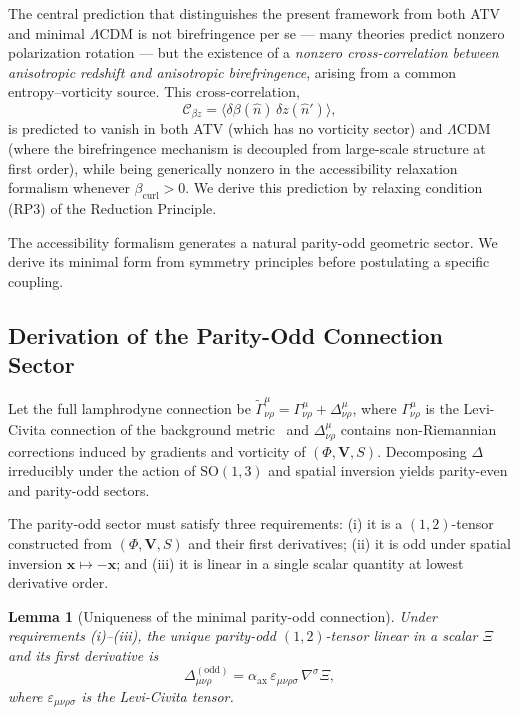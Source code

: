 \documentclass[12pt,a4paper]{article}
\theoremstyle{plain}
\newtheorem{lemma}[theorem]{Lemma}
\theoremstyle{definition}
\theoremstyle{remark}
\newcommand{\Cbz}{\mathcal{C}_{\beta z}}
\newcommand{\bcurl}{\beta_{\mathrm{curl}}}
\begin{document}
The central prediction that distinguishes the present framework from both ATV
and minimal $\Lambda$CDM is not birefringence per se --- many theories predict
nonzero polarization rotation --- but the existence of a \emph{nonzero
cross-correlation between anisotropic redshift and anisotropic birefringence},
arising from a common entropy--vorticity source. This cross-correlation,
\begin{equation}
  \Cbz = \bigl\langle\delta\beta(\hat{n})\,\delta z(\hat{n}')\bigr\rangle,
  \label{eq:Cbz_headline}
\end{equation}
is predicted to vanish in both ATV (which has no vorticity sector) and $\Lambda$CDM
(where the birefringence mechanism is decoupled from large-scale structure at first
order), while being generically nonzero in the accessibility relaxation formalism
whenever $\bcurl > 0$. We derive this prediction by relaxing condition
\textup{(RP3)} of the Reduction Principle.

The accessibility formalism generates a natural parity-odd geometric sector.
We derive its minimal form from symmetry principles before postulating a specific
coupling.

\subsection{Derivation of the Parity-Odd Connection Sector}
\label{subsec:parityodd}

Let the full lamphrodyne connection be
$\tilde\Gamma^\mu_{\nu\rho} = \Gamma^\mu_{\nu\rho} + \Delta^\mu_{\nu\rho}$,
where $\Gamma^\mu_{\nu\rho}$ is the Levi-Civita connection of the background
metric~\cite{Wald1984} and $\Delta^\mu_{\nu\rho}$ contains non-Riemannian
corrections induced by gradients and vorticity of $(\Phi,\mathbf{V},S)$.
Decomposing $\Delta$ irreducibly under the action of $\mathrm{SO}(1,3)$ and
spatial inversion yields parity-even and parity-odd sectors.

The parity-odd sector must satisfy three requirements: (i) it is a $(1,2)$-tensor
constructed from $(\Phi,\mathbf{V},S)$ and their first derivatives; (ii) it is
odd under spatial inversion $\mathbf{x}\mapsto-\mathbf{x}$; and (iii) it is linear
in a single scalar quantity at lowest derivative order.

\begin{lemma}[Uniqueness of the minimal parity-odd connection]
\label{lem:parityodd_unique}
Under requirements \textup{(i)--(iii)}, the unique parity-odd $(1,2)$-tensor
linear in a scalar $\Xi$ and its first derivative is
\begin{equation}
  \Delta^{(\mathrm{odd})}_{\mu\nu\rho}
  = \alpha_{\mathrm{ax}}\,\varepsilon_{\mu\nu\rho\sigma}\,\nabla^\sigma\Xi,
  \label{eq:odd_unique}
\end{equation}
where $\varepsilon_{\mu\nu\rho\sigma}$ is the Levi-Civita tensor.
\end{lemma}
\end{document}
